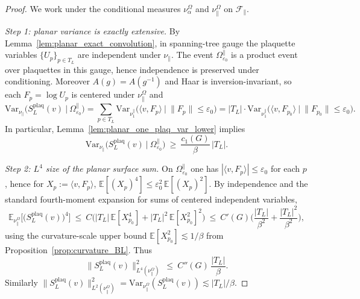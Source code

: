 \begin{proof}
We work under the conditional measures $\nu_{\alpha}^{\Omega}$ and $\nu_{\parallel}^{\Omega}$ on $\mathscr F_{\parallel}$.

\smallskip
\noindent\emph{Step 1: planar variance is exactly extensive.}
By Lemma~\ref{lem:planar_exact_convolution}, in spanning-tree gauge the plaquette variables $\{U_p\}_{p\in T_L}$ are independent under $\nu_{\parallel}$.
The event $\Omega_{\varepsilon_0}^{\parallel}$ is a product event over plaquettes in this gauge, hence independence is preserved under conditioning.
Moreover $A(g)=A(g^{-1})$ and Haar is inversion-invariant, so each $F_p=\log U_p$ is centered under $\nu_{\parallel}^{\Omega}$ and
\[
\mathrm{Var}_{\nu_{\parallel}}\!\Big(S_L^{\mathrm{plaq}}(v)\ \Big|\ \Omega_{\varepsilon_0}^{\parallel}\Big)
=
\sum_{p\in T_L}\mathrm{Var}_{\nu_1^{\parallel}}\!\Big(\langle v,F_{p}\rangle\ \Big|\ \|F_{p}\|\le \varepsilon_0\Big)
=
|T_L|\cdot \mathrm{Var}_{\nu_1^{\parallel}}\!\Big(\langle v,F_{p_0}\rangle\ \Big|\ \|F_{p_0}\|\le \varepsilon_0\Big).
\]
In particular, Lemma~\ref{lem:planar_one_plaq_var_lower} implies
\begin{equation}\label{eq:B9_planA_planar_var_lb}
\mathrm{Var}_{\nu_{\parallel}}\!\Big(S_L^{\mathrm{plaq}}(v)\ \Big|\ \Omega_{\varepsilon_0}^{\parallel}\Big)\ \ge\ \frac{c_1(G)}{\beta}\,|T_L|.
\end{equation}

\smallskip
\noindent\emph{Step 2: $L^4$ size of the planar surface sum.}
On $\Omega_{\varepsilon_0}^{\parallel}$ one has $|\langle v,F_p\rangle|\le \varepsilon_0$ for each $p$, hence for $X_p:=\langle v,F_p\rangle$,
$\mathbb E[(X_p)^4]\le \varepsilon_0^2\,\mathbb E[(X_p)^2]$.
By independence and the standard fourth-moment expansion for sums of centered independent variables,
\[
\mathbb E_{\nu_{\parallel}^{\Omega}}\!\Big[\big(S_L^{\mathrm{plaq}}(v)\big)^4\Big]
\ \le\
C\Big(|T_L|\,\mathbb E[X_{p_0}^4]+|T_L|^2\,\mathbb E[X_{p_0}^2]^2\Big)
\ \le\
C'(G)\Big(\frac{|T_L|}{\beta^2}+\frac{|T_L|^2}{\beta^2}\Big),
\]
using the curvature-scale upper bound $\mathbb E[X_{p_0}^2]\lesssim 1/\beta$ from Proposition~\ref{prop:curvature_BL}.
Thus
\begin{equation}\label{eq:B9_planA_L4_bound}
\|S_L^{\mathrm{plaq}}(v)\|_{L^4(\nu_{\parallel}^{\Omega})}^2\ \le\ C''(G)\,\frac{|T_L|}{\beta}.
\end{equation}
Similarly $\|S_L^{\mathrm{plaq}}(v)\|_{L^2(\nu_{\parallel}^{\Omega})}^2=\mathrm{Var}_{\nu_{\parallel}^{\Omega}}(S_L^{\mathrm{plaq}}(v))\lesssim |T_L|/\beta$.


\end{proof}
